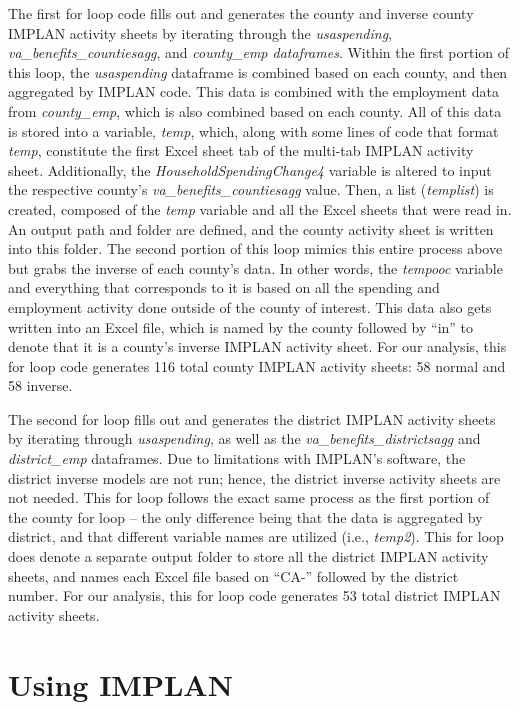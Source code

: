 \documentclass[
]{book}
\begin{document}
The first for loop code fills out and generates the county and inverse county IMPLAN activity sheets by iterating through the \emph{usaspending}, \emph{va\_benefits\_countiesagg}, and \emph{county\_emp dataframes}. Within the first portion of this loop, the \emph{usaspending} dataframe is combined based on each county, and then aggregated by IMPLAN code. This data is combined with the employment data from \emph{county\_emp}, which is also combined based on each county. All of this data is stored into a variable, \emph{temp}, which, along with some lines of code that format \emph{temp}, constitute the first Excel sheet tab of the multi-tab IMPLAN activity sheet. Additionally, the \emph{HouseholdSpendingChange4} variable is altered to input the respective county's \emph{va\_benefits\_countiesagg} value. Then, a list (\emph{templist}) is created, composed of the \emph{temp} variable and all the Excel sheets that were read in. An output path and folder are defined, and the county activity sheet is written into this folder. The second portion of this loop mimics this entire process above but grabs the inverse of each county's data. In other words, the \emph{tempooc} variable and everything that corresponds to it is based on all the spending and employment activity done outside of the county of interest. This data also gets written into an Excel file, which is named by the county followed by ``in'' to denote that it is a county's inverse IMPLAN activity sheet. For our analysis, this for loop code generates 116 total county IMPLAN activity sheets: 58 normal and 58 inverse.

The second for loop fills out and generates the district IMPLAN activity sheets by iterating through \emph{usaspending}, as well as the \emph{va\_benefits\_districtsagg} and \emph{district\_emp} dataframes. Due to limitations with IMPLAN's software, the district inverse models are not run; hence, the district inverse activity sheets are not needed. This for loop follows the exact same process as the first portion of the county for loop -- the only difference being that the data is aggregated by district, and that different variable names are utilized (i.e., \emph{temp2}). This for loop does denote a separate output folder to store all the district IMPLAN activity sheets, and names each Excel file based on ``CA-'' followed by the district number. For our analysis, this for loop code generates 53 total district IMPLAN activity sheets.

\hypertarget{implan}{%
\section{Using IMPLAN}\label{implan}}
\end{document}
